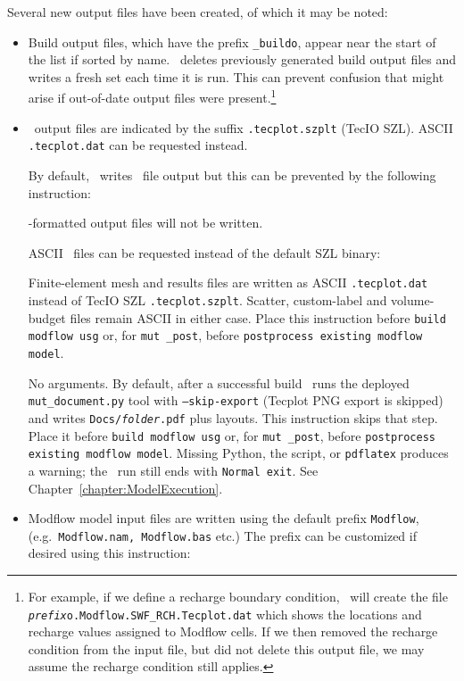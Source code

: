 Several new output files have been created, of which it may be noted:
\begin{itemize}
    \item Build output files, which have the prefix \texttt{\_buildo}, appear near the start of the list if sorted by name. \mut\ deletes previously generated build output files and writes a fresh set each time it is run.  This can prevent confusion that might arise if out-of-date output files were present.\footnote{For example, if we define a recharge boundary condition, \mut\ will create the file \texttt{\textit{prefix}o.Modflow.SWF\_RCH.Tecplot.dat} which shows the locations and recharge values assigned to Modflow cells.  If we then removed the recharge condition from the input file, but did not delete this output file, we may assume the recharge condition still applies.}
    \item \tecplot\ output files are indicated by the suffix \texttt{.tecplot.szplt} (TecIO SZL). ASCII \texttt{.tecplot.dat} can be requested instead.

    \newpage
    By default, \mut\ writes \tecplot\ file output but this can be prevented by the following instruction:

            {\tecplot-formatted output files will not be written.}

    ASCII \tecplot\ files can be requested instead of the default SZL binary:

            {Finite-element mesh and results files are written as ASCII \texttt{.tecplot.dat} instead of TecIO SZL \texttt{.tecplot.szplt}. Scatter, custom-label and volume-budget files remain ASCII in either case. Place this instruction before \texttt{build modflow usg} or, for \texttt{mut \_post}, before \texttt{postprocess existing modflow model}.}

            {No arguments. By default, after a successful build \mut\ runs the deployed \texttt{mut\_document.py} tool with \texttt{--skip-export} (Tecplot PNG export is skipped) and writes \texttt{Docs/\textit{folder}.pdf} plus layouts. This instruction skips that step. Place it before \texttt{build modflow usg} or, for \texttt{mut \_post}, before \texttt{postprocess existing modflow model}. Missing Python, the script, or \texttt{pdflatex} produces a warning; the \mut\ run still ends with \texttt{Normal exit}. See Chapter~\ref{chapter:ModelExecution}.}

    \item Modflow model input files are written using the default prefix \texttt{Modflow}, (e.g.\ \texttt{Modflow.nam, Modflow.bas} etc.)  The prefix can be customized if desired using this instruction:
        

\end{itemize}
